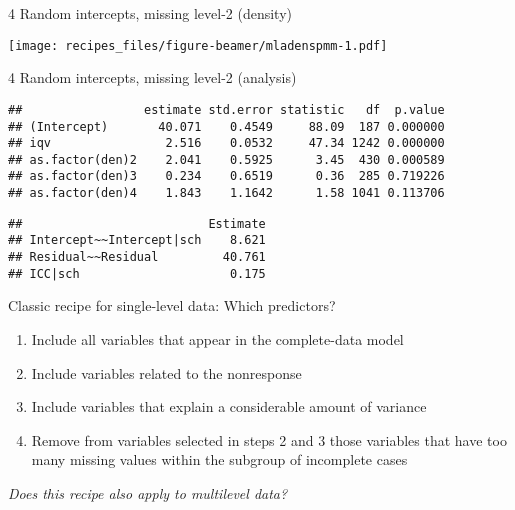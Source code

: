 \documentclass[ignorenonframetext,aspectratio=43]{beamer}
\providecommand{\tightlist}{%
  \setlength{\itemsep}{0pt}\setlength{\parskip}{0pt}}
\begin{document}
\begin{frame}{4 Random intercepts, missing level-2 (density)}

\texttt{[image: recipes\_files/figure-beamer/mladenspmm-1.pdf]}

\end{frame}

\begin{frame}[fragile]{4 Random intercepts, missing level-2 (analysis)}

\begin{verbatim}
##                 estimate std.error statistic   df  p.value
## (Intercept)       40.071    0.4549     88.09  187 0.000000
## iqv                2.516    0.0532     47.34 1242 0.000000
## as.factor(den)2    2.041    0.5925      3.45  430 0.000589
## as.factor(den)3    0.234    0.6519      0.36  285 0.719226
## as.factor(den)4    1.843    1.1642      1.58 1041 0.113706
\end{verbatim}

\begin{verbatim}
##                          Estimate
## Intercept~~Intercept|sch    8.621
## Residual~~Residual         40.761
## ICC|sch                     0.175
\end{verbatim}

\end{frame}

\begin{frame}{Classic recipe for single-level data: Which predictors?}

\begin{enumerate}
\def\labelenumi{\arabic{enumi}.}
\tightlist
\item
  Include all variables that appear in the complete-data model
\item
  Include variables related to the nonresponse
\item
  Include variables that explain a considerable amount of variance
\item
  Remove from variables selected in steps 2 and 3 those variables that
  have too many missing values within the subgroup of incomplete cases
\end{enumerate}

\emph{Does this recipe also apply to multilevel data?}

\end{frame}
\end{document}
